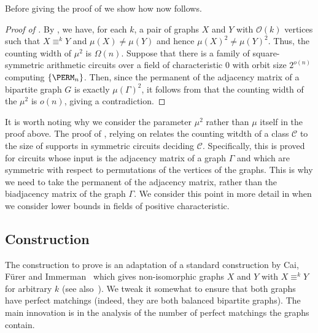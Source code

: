\documentclass{toc}
\begin{document}
Before giving the proof of  we show how
 now follows.

\begin{proof}[Proof of ]
  By , we have, for each $k$, a pair of graphs $X$ and $Y$
  with $\mathcal{O}(k)$ vertices such that  $X
  \equiv^k Y$ and $\mu(X) \neq \mu(Y)$ and hence $\mu(X)^2 \neq \mu(Y)^2$.  Thus, the counting width of $\mu^2$  is $\Omega(n)$.
  Suppose that there is a family of square-symmetric arithmetic circuits over a
  field of characteristic $0$ with orbit size $2^{o(n)}$ computing
  $\{\PERM_n\}$.  Then, since the permanent of the adjacency matrix of a bipartite graph $G$ is exactly $\mu(\Gamma)^2$, it follows from
   that the counting width of the
  $\mu^2$ is $o(n)$, giving a contradiction.
\end{proof}

It is worth noting why we consider the parameter $\mu^2$ rather than $\mu$ itself in the proof above.  The proof of , relying on \cite[Theorem 6]{AndersonD17} relates the counting witdth of a class $\mathcal{C}$ to the size of supports in symmetric circuits deciding $\mathcal{C}$.  Specifically, this is proved for circuits whose input is the adjacency matrix of a graph $\Gamma$ and which are symmetric with respect to permutations of the vertices of the graphs.  This is why we need to take the permanent of the adjacency matrix, rather than the biadjacency matrix of the graph $\Gamma$.  We consider this point in more detail in  when we consider lower bounds in fields of positive characteristic.

\subsection{Construction}\label{sec:construction}
The construction to prove  is an adaptation of a
standard construction by Cai, F\"{u}rer and Immerman~\cite{CFI92} which gives
non-isomorphic graphs $X$ and $Y$ with $X \equiv^k Y$ for arbitrary $k$ (see
also~\cite{DR07}). We tweak it somewhat to ensure that both graphs have perfect
matchings (indeed, they are both balanced bipartite graphs). The main innovation
is in the analysis of the number of perfect matchings the graphs contain.
\end{document}
